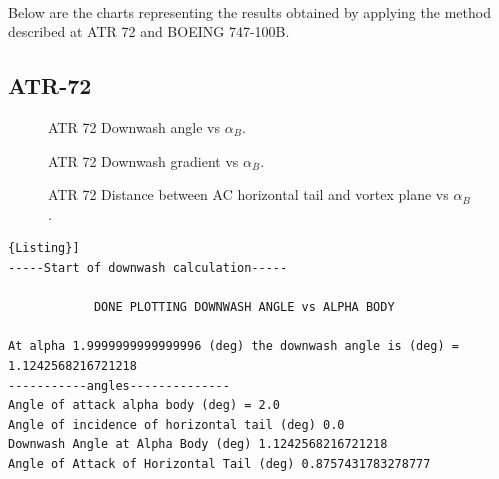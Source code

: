 %
%
%
%
%
%	                     



\noindent \\

Below are the charts representing the results obtained by applying the method described at ATR 72 and BOEING 747-100B.

\subsection{ATR-72}

\begin{figure}[H]
\centering

\caption{ATR 72 Downwash angle vs $\alpha_{B}$.}
\label{fig:epsilon}
\end{figure}

\begin{figure}[H]
\centering

\caption{ATR 72 Downwash gradient vs $\alpha_{B}$.}
\label{fig:downwashgradATR}
\end{figure}

\begin{figure}[H]
\centering

\caption{ATR 72 Distance between AC horizontal tail and vortex plane vs $\alpha_{B}$.}
\label{fig:zATR}
\end{figure}

\begin{lstlisting}[caption={{\footnotesize Downwash estimation - Results. ATR 72}},label= [style=\bfseries]{Listing}]
-----Start of downwash calculation-----

			DONE PLOTTING DOWNWASH ANGLE vs ALPHA BODY

At alpha 1.9999999999999996 (deg) the downwash angle is (deg) = 1.1242568216721218
-----------angles-------------- 
Angle of attack alpha body (deg) = 2.0
Angle of incidence of horizontal tail (deg) 0.0
Downwash Angle at Alpha Body (deg) 1.1242568216721218
Angle of Attack of Horizontal Tail (deg) 0.8757431783278777
\end{lstlisting}


